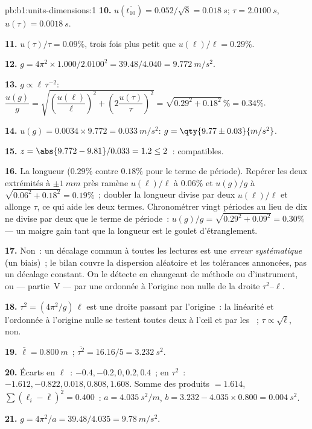 \begin{solution}{pb:b1:units-dimensions:1}
\textbf{10.} $u(\overline{t_{10}}) = 0.052/\sqrt8 = \qty{0.018}{s}$;
$\tau = \qty{2.0100}{s}$, $u(\tau) = \qty{0.0018}{s}$.

\textbf{11.} $u(\tau)/\tau = 0.09\%$, trois fois plus petit que
$u(\ell)/\ell = 0.29\%$.

\textbf{12.} $g = 4\pi^2 \times 1.000/2.0100^2 = 39.48/4.040 =
\qty{9.772}{m/s^2}$.

\textbf{13.} $g \propto \ell\,\tau^{-2}$:
$\dfrac{u(g)}{g} = \sqrt{\left(\dfrac{u(\ell)}{\ell}\right)^2
+ \left(2\dfrac{u(\tau)}{\tau}\right)^2} = \sqrt{0.29^2 + 0.18^2}\,\%
= 0.34\%$.

\textbf{14.} $u(g) = 0.0034 \times 9.772 = \qty{0.033}{m/s^2}$:
$g = \qty{9.77\pm0.03}{m/s^2}$.

\textbf{15.} $z = \abs{9.772 - 9.81}/0.033 = 1.2 \leq 2$~: compatibles.

\textbf{16.} La longueur ($0.29\%$ contre $0.18\%$ pour le terme de
période). Repérer les deux extrémités à $\pm\qty{1}{mm}$ près ramène
$u(\ell)/\ell$ à $0.06\%$ et $u(g)/g$ à
$\sqrt{0.06^2 + 0.18^2} = 0.19\%$~; doubler la longueur divise par deux
$u(\ell)/\ell$ et allonge $\tau$, ce qui aide les deux termes.
Chronométrer vingt périodes au lieu de dix ne divise par deux que le
terme de période~: $u(g)/g = \sqrt{0.29^2 + 0.09^2} = 0.30\%$ --- un
maigre gain tant que la longueur est le goulet d'étranglement.

\textbf{17.} Non~: un décalage commun à toutes les lectures est une
\emph{erreur systématique} (un biais)~; le bilan couvre la dispersion
aléatoire et les tolérances annoncées, pas un décalage constant. On le
détecte en changeant de méthode ou d'instrument, ou --- partie~V --- par
une ordonnée à l'origine non nulle de la droite $\tau^2$--$\ell$.

\textbf{18.} $\tau^2 = (4\pi^2/g)\,\ell$ est une droite passant par
l'origine~: la linéarité et l'ordonnée à l'origine nulle se testent
toutes deux à l'œil et par les ~; $\tau \propto \sqrt\ell$, non.

\textbf{19.} $\bar\ell = \qty{0.800}{m}$~; $\overline{\tau^2} = 16.16/5 =
\qty{3.232}{s^2}$.

\textbf{20.} Écarts en $\ell$~: $-0.4, -0.2, 0, 0.2, 0.4$~; en
$\tau^2$~: $-1.612, -0.822, 0.018, 0.808, 1.608$. Somme des produits $= 1.614$,
$\sum(\ell_i - \bar\ell)^2 = 0.400$~: $a = \qty{4.035}{s^2/m}$,
$b = 3.232 - 4.035 \times 0.800 = \qty{0.004}{s^2}$.

\textbf{21.} $g = 4\pi^2/a = 39.48/4.035 = \qty{9.78}{m/s^2}$.


\end{solution}
